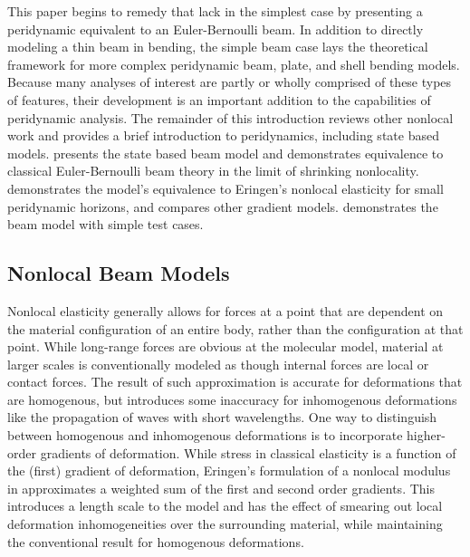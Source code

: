 \documentclass[11pt]{amsart}
\begin{document}
This paper begins to remedy that lack in the simplest case by presenting a peridynamic equivalent to an Euler-Bernoulli beam.
In addition to directly modeling a thin beam in bending, the simple beam case lays the theoretical framework for more complex peridynamic beam, plate, and shell bending models.
Because many analyses of interest are partly or wholly comprised of these types of features, their development is an important addition to the capabilities of peridynamic analysis.
%
The remainder of this introduction reviews other nonlocal work and provides a brief introduction to peridynamics, including state based models.
 presents the state based beam model and demonstrates equivalence to classical Euler-Bernoulli beam theory in the limit of shrinking nonlocality.
 demonstrates the model's equivalence to Eringen's nonlocal elasticity for small peridynamic horizons, and compares other gradient models.
 demonstrates the beam model with simple test cases.
%
\subsection{Nonlocal Beam Models}
\label{sec:NLbeams}
%
Nonlocal elasticity generally allows for forces at a point that are dependent on the material configuration of an entire body, rather than the configuration at that point.\cite{eringen1972nonlocal}
While long-range forces are obvious at the molecular model, material at larger scales is conventionally modeled as though internal forces are local or contact forces.\cite{kroner1967elasticity}
The result of such approximation is accurate for deformations that are homogenous, but introduces some inaccuracy for inhomogenous deformations like the propagation of waves with short wavelengths.
One way to distinguish between homogenous and inhomogenous deformations is to incorporate higher-order gradients of deformation.
While stress in classical elasticity is a function of the (first) gradient of deformation, Eringen's formulation of a nonlocal modulus in \cite{eringen1983differential} approximates a weighted sum of the first and second order gradients.
This introduces a length scale to the model and has the effect of smearing out local deformation inhomogeneities over the surrounding material, while maintaining the conventional result for homogenous deformations.
\end{document}
